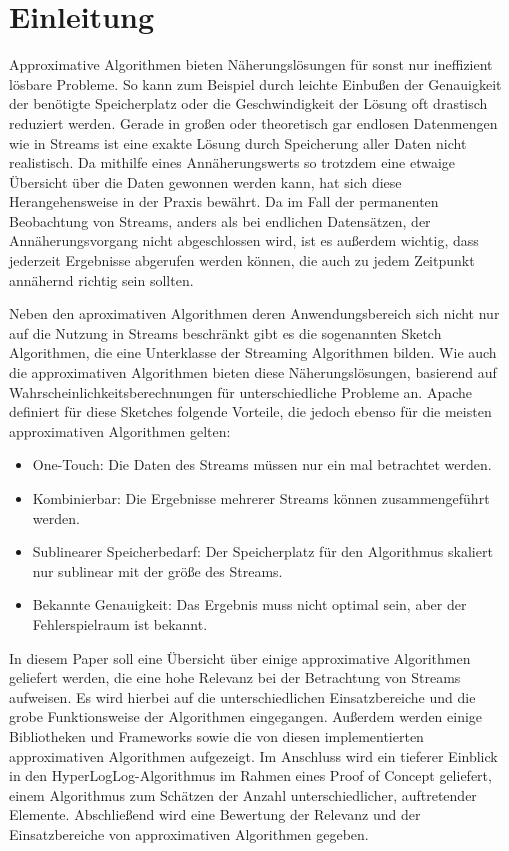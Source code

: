 \section{Einleitung}

Approximative Algorithmen bieten Näherungslösungen für sonst nur ineffizient lösbare Probleme.
So kann zum Beispiel durch leichte Einbußen der Genauigkeit der benötigte Speicherplatz oder die Geschwindigkeit der Lösung oft drastisch reduziert werden.
Gerade in großen oder theoretisch gar endlosen Datenmengen wie in Streams ist eine exakte Lösung durch Speicherung aller Daten nicht realistisch.
Da mithilfe eines Annäherungswerts so trotzdem eine etwaige Übersicht über die Daten gewonnen werden kann, hat sich diese Herangehensweise in der Praxis bewährt.
Da im Fall der permanenten Beobachtung von Streams, anders als bei endlichen Datensätzen, der Annäherungsvorgang nicht abgeschlossen wird, ist es außerdem wichtig, dass jederzeit Ergebnisse abgerufen werden können, die auch zu jedem Zeitpunkt annähernd richtig sein sollten.

Neben den aproximativen Algorithmen deren Anwendungsbereich sich nicht nur auf die Nutzung in Streams beschränkt gibt es die sogenannten Sketch Algorithmen, die eine Unterklasse der Streaming Algorithmen bilden.
Wie auch die approximativen Algorithmen bieten diese Näherungslösungen, basierend auf Wahrscheinlichkeitsberechnungen für unterschiedliche Probleme an.
Apache \cite{apachedatasketches} definiert für diese Sketches folgende Vorteile, die jedoch ebenso für die meisten approximativen Algorithmen gelten:

\begin{itemize}
	\item One-Touch: Die Daten des Streams müssen nur ein mal betrachtet werden.
	\item Kombinierbar: Die Ergebnisse mehrerer Streams können zusammengeführt werden.
	\item Sublinearer Speicherbedarf: Der Speicherplatz für den Algorithmus skaliert nur sublinear mit der größe des Streams.
	\item Bekannte Genauigkeit: Das Ergebnis muss nicht optimal sein, aber der Fehlerspielraum ist bekannt.
\end{itemize}

In diesem Paper soll eine Übersicht über einige approximative Algorithmen geliefert werden, die eine hohe Relevanz bei der Betrachtung von Streams aufweisen.
Es wird hierbei auf die unterschiedlichen Einsatzbereiche und die grobe Funktionsweise der Algorithmen eingegangen.
Außerdem werden einige Bibliotheken und Frameworks sowie die von diesen implementierten approximativen Algorithmen aufgezeigt.
Im Anschluss wird ein tieferer Einblick in den HyperLogLog-Algorithmus im Rahmen eines Proof of Concept geliefert, einem Algorithmus zum Schätzen der Anzahl unterschiedlicher, auftretender Elemente.
Abschließend wird eine Bewertung der Relevanz und der Einsatzbereiche von approximativen Algorithmen gegeben.